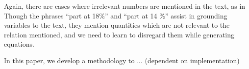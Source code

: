 \documentclass[11pt]{article}
\begin{document}
  Again, there are cases where irrelevant numbers are mentioned in the
  text, as in
  \noindent
  Though the phrases ``part at 18\%'' and ``part at 14 \%'' assist in
  grounding variables to the text, they mention quantities which are
  not relevant to the relation mentioned, and we need to learn to
  disregard them while generating equations.

  In this paper, we develop a methodology to ... (dependent on
  implementation)
  
  
\end{document}
